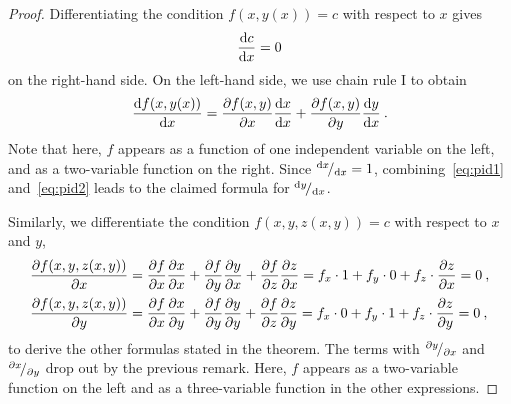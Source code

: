 \begin{proof} Differentiating the condition $f(x,y(x))=c$ with respect to $x$ gives
\begin{equation}
\label{eq:pid1}
\Df{c}{x} = 0
\end{equation}
on the right-hand side. On the left-hand side, we use chain rule I to obtain
\begin{equation}
\label{eq:pid2}
\Df{f(x,y(x))}{x} = \df{f(x,y)}{x}\Df{x}{x} + \df{f(x,y)}{y}\Df{y}{x} \:.
\end{equation}
Note that here, $f$ appears as a function of one independent variable on the left, and as a two-variable function on the right. Since ${}^{\mathrm{d} x}\!/_{\mathrm{d} x} = 1$, combining~\eqref{eq:pid1} and~\eqref{eq:pid2} leads to the claimed formula for ${}^{\mathrm{d} y}\!/_{\mathrm{d} x}$.

Similarly, we differentiate the condition $f(x,y,z(x,y))=c$ with respect to $x$ and $y$,
\begin{equation*}
\begin{split}
\displaystyle{\frac{\partial f(x,y,z(x,y))}{\partial x}} & = \displaystyle{\frac{\partial f}{\partial x}}\displaystyle{\frac{\partial x}{\partial x}} + \displaystyle{\frac{\partial f}{\partial y}}\displaystyle{\frac{\partial y}{\partial x}} +\displaystyle{\frac{\partial f}{\partial z}}\displaystyle{\frac{\partial z}{\partial x}} 
= f_x \cdot 1 + f_y \cdot 0 +f_z \cdot \displaystyle{\frac{\partial z}{\partial x}} = 0 \:, \\
\displaystyle{\frac{\partial f(x,y,z(x,y))}{\partial y}} & = \displaystyle{\frac{\partial f}{\partial x}}\displaystyle{\frac{\partial x}{\partial y}} + \displaystyle{\frac{\partial f}{\partial y}}\displaystyle{\frac{\partial y}{\partial y}} +\displaystyle{\frac{\partial f}{\partial z}}\displaystyle{\frac{\partial z}{\partial y}} 
= f_x \cdot 0 + f_y \cdot 1 +f_z \cdot \displaystyle{\frac{\partial z}{\partial y}} = 0 \:,
\end{split}
\end{equation*}
to derive the other formulas stated in the theorem. The terms with ${}^{\partial y}\!/_{\partial x}$ and ${}^{\partial x}\!/_{\partial y}$ drop out by the previous remark. Here, $f$ appears as a two-variable function on the left and as a three-variable function in the other expressions.
\end{proof}
	
